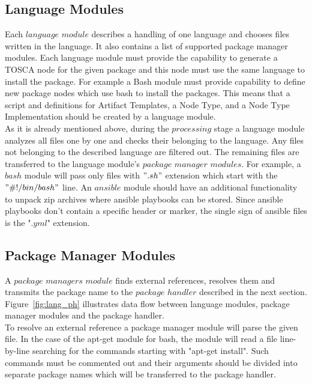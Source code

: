 \subsection{Language Modules} \label{subs:archlm}
Each $language$ $module$ describes a handling of one language and chooses files written in the language.
It also contains a list of supported package manager modules.
Each language module must provide the capability to generate a TOSCA node for the given package and this node must use the same language to install the package.
For example a Bash module must provide capability to define new package nodes which use bash to install the packages.
This means that a script and definitions for Artifact Templates, a Node Type, and a Node Type Implementation should be created by a language module.\\
As it is already mentioned above, during the $processing$ stage a language module analyzes all files one by one and checks their belonging to the language. 
Any files not belonging to the described language are filtered out.
The remaining files are transferred to the language module's $package$ $manager$ $modules$.
For example, a $bash$ module will pass only files with $".sh"$ extension which start with the $"\#!/bin/bash"$ line.
An $ansible$ module should have an additional functionality to unpack zip archives where ansible playbooks can be stored.
Since ansible playbooks don't contain a specific header or marker, the single sign of ansible files is the "$.yml$" extension. 

\subsection{Package Manager Modules} \label{subs:archpmm}
A $package$ $managers$ $module$ finds external references, resolves them and transmits the package name to the $package$ $handler$ described in the next section.
Figure~\ref{fig:lang_ph} illustrates data flow between language modules, package manager modules and the package handler.\\
To resolve an external reference a package manager module will parse the given file. 
In the case of the apt-get module for bash, the module will read a file line-by-line searching for the commands starting with "apt-get install".
Such commands must be commented out and their arguments should be divided into separate package names which will be transferred to the package handler. 



